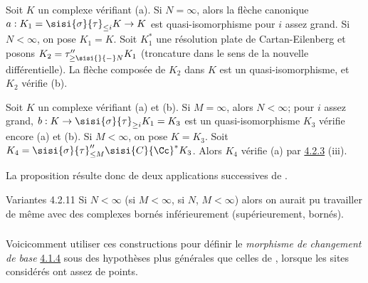 \documentclass[10pt]{../fichiers-configuration-latex/smfart}
\begin{document}
Soit $K$ un complexe vérifiant (a). Si $N=\infty$, alors la flèche
canonique $a:K_1=\sisi{\sigma}{\tau}_{\leq i}K\rightarrow K$ est quasi-isomorphisme
pour $i$ assez grand. Si $N<\infty$, on pose $K_1=K$. Soit
$K^{\ast}_1$ une résolution plate de Cartan-Eilenberg et posons
$K_2=\tau''_{\geq \sisi{}{-}N}K_1$ (troncature dans le sens de la nouvelle
différentielle). La flèche composée de $K_2$ dans $K$ est un
quasi-isomorphisme, et $K_2$ vérifie (b).

Soit $K$ un complexe vérifiant (a) et (b). Si $M=\infty$, alors
$N<\infty$; pour $i$ assez grand, $b:K\rightarrow \sisi{\sigma}{\tau}_{\geq
i}K_1=K_3$ est un quasi-isomorphisme  $K_3$ vérifie encore (a) et
(b). Si $M<\infty$, on pose $K=K_3$. Soit $K_4=\sisi{\sigma}{\tau}''_{\leq M}
\sisi{C}{\Cc}^{\ast}K_3$. Alors $K_4$ vérifie (a)  par \hyperref[XVII.prop4.2.3]{4.2.3} (iii).

La proposition résulte donc de deux applications successives de \cite[I
2.4.2]{SGA4-17:CD}.

\begin{enonce*}[remark]{Variantes 4.2.11}
Si $N<\infty$ (\resp si $M<\infty$, \resp si $N$, $M<\infty$) alors on
aurait pu travailler de même avec des complexes bornés inférieurement
(\resp supérieurement, \resp bornés).
\end{enonce*}

\setcounter{subsubsection}{11}
\subsubsection{}
Voici\pageoriginale comment utiliser ces constructions pour définir le
\emph{morphisme de changement de base} \hyperref[XVII.subsubsec4.1.4]{4.1.4} sous
des hypothèses plus générales que celles de \loccit, lorsque les sites
considérés ont assez de points.
\end{document}
